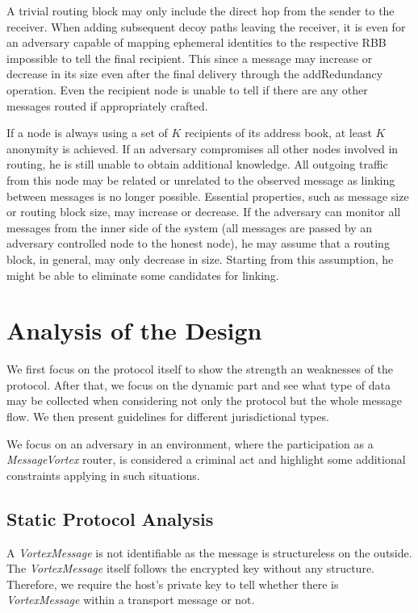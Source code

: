 \documentclass[acmsmall, screen]{acmart}
\begin{document}
A trivial routing block may only include the direct hop from the sender to the receiver. When adding subsequent decoy paths leaving the receiver, it is even for an adversary capable of mapping ephemeral identities to the respective RBB impossible to tell the final recipient. This since a message may increase or decrease in its size even after the final delivery through the addRedundancy operation. Even the recipient node is unable to tell if there are any other messages routed if appropriately crafted.

If a node is always using a set of $K$ recipients of its address book, at least $K$ anonymity is achieved. If an adversary compromises all other nodes involved in routing, he is still unable to obtain additional knowledge. All outgoing traffic from this node may be related or unrelated to the observed message as linking between messages is no longer possible. Essential properties, such as message size or routing block size, may increase or decrease. If the adversary can monitor all messages from the inner side of the system (all messages are passed by an adversary controlled node to the honest node), he may assume that a routing block, in general, may only decrease in size. Starting from this assumption, he might be able to eliminate some candidates for linking.

\section{Analysis of the Design\label{sec:discussion}}
We first focus on the protocol itself to show the strength an weaknesses of the protocol. After that, we focus on the dynamic part and see what type of data may be collected when considering not only the protocol but the whole message flow. We then present guidelines for different jurisdictional types.

We focus on an adversary in an environment, where the participation as a \emph{MessageVortex} router, is considered a criminal act and highlight some additional constraints applying in such situations.

\subsection{Static Protocol Analysis\label{sec:staticAnalysis}}
A \emph{VortexMessage} is not identifiable as the message is structureless on the outside. The \emph{VortexMessage} itself follows the encrypted key without any structure. Therefore, we require the host's private key to tell whether there is \emph{VortexMessage} within a transport message or not.
\end{document}
